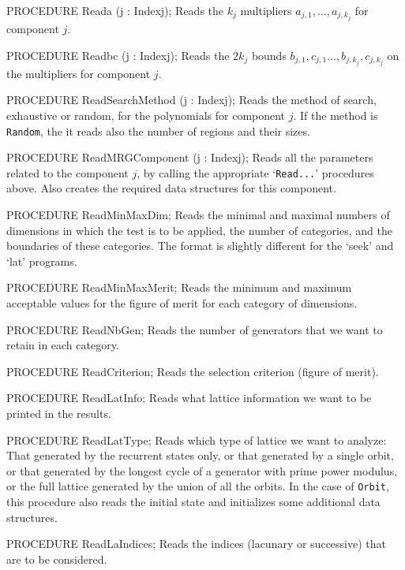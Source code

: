 PROCEDURE Reada (j : Indexj);
\endcode
 \tab
  Reads the $k_j$ multipliers $a_{j,1},\dots,a_{j,k_j}$ for component $j$.
 \endtab
\code

PROCEDURE Readbc (j : Indexj);
\endcode
 \tab
  Reads the $2k_j$ bounds $b_{j,1},c_{j,1}\dots,b_{j,k_j},c_{j,k_j}$ 
  on the multipliers for component $j$.
 \endtab
\code

PROCEDURE ReadSearchMethod (j : Indexj);
\endcode
 \tab
  Reads the method of search, exhaustive or random, for the polynomials
  for component $j$.  If the method is {\tt Random}, the it reads also
  the number of regions and their sizes.
 \endtab
\code

PROCEDURE ReadMRGComponent (j : Indexj);
\endcode
 \tab
  Reads all the parameters related to the component $j$,
  by calling the appropriate `{\tt Read...}' procedures above.
  Also creates the required data structures for this component.
 \endtab
\code

PROCEDURE ReadMinMaxDim;
\endcode
 \tab
  Reads the minimal and maximal numbers of dimensions in which the
  test is to be applied, the number of categories,
  and the boundaries of these categories.
  The format is slightly different for the `seek' and `lat'
  programs.
 \endtab
\code

PROCEDURE ReadMinMaxMerit;
\endcode
 \tab
  Reads the minimum and maximum acceptable values for the figure 
  of merit for each category of dimensions.
 \endtab
\code

PROCEDURE ReadNbGen;
\endcode
 \tab
  Reads the number of generators that we want to retain in each
  category.
 \endtab
\code

PROCEDURE ReadCriterion;
\endcode
 \tab
  Reads the selection criterion (figure of merit).
 \endtab
\code

PROCEDURE ReadLatInfo;
\endcode
 \tab
  Reads what lattice information we want to be printed in the results.
 \endtab
\code

PROCEDURE ReadLatType;
\endcode
 \tab
  Reads which type of lattice we want to analyze:
  That generated by the recurrent states only, or that generated by
  a single orbit, or that generated by the longest cycle of a 
  generator with prime power modulus, or the full lattice generated
  by the union of all the orbits.
  In the case of {\tt Orbit}, this procedure also reads the initial
  state and initializes some additional data structures.
 \endtab
\code

PROCEDURE ReadLaIndices;
\endcode
 \tab
  Reads the indices (lacunary or successive) that are to be considered.
 \endtab
\code

